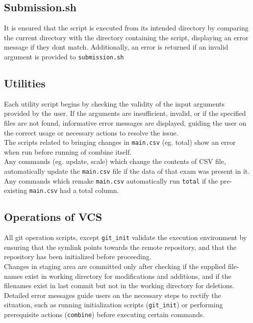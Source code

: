 \documentclass{article}
\begin{document}
\subsection{Submission.sh}
It is ensured that the script is executed from its intended directory by comparing the current directory with the directory containing the script, displaying an error message if they dont match. Additionally, an error is returned if an invalid argument is provided to \texttt{submission.sh}

\subsection{Utilities}
Each utility script begins by checking the validity of the input arguments provided by the user. If the arguments are insufficient, invalid, or if the specified files are not found, informative error messages are displayed, guiding the user on the correct usage or necessary actions to resolve the issue. \\
The scripts related to bringing changes in \texttt{main.csv} (eg. total) show an error when run before running of combine itself.\\
Any commands (eg. update, scale) which change the contents of CSV file, automatically update the \texttt{main.csv} file if the data of that exam was present in it.\\
Any commands which remake \texttt{main.csv} automatically run \texttt{total} if the pre-existing \texttt{main.csv} had a total column.\\ 

\subsection{Operations of VCS}
All git operation scripts, except \texttt{git\_init} validate the execution environment by ensuring that the symlink points towards the remote repository, and that the repository has been initialized before proceeding.\\
Changes in staging area are committed only after checking if the supplied file-names exist in working directory for modifications and additions, and if the filenames exist in last commit but not in the working directory for deletions.\\
Detailed error messages guide users on the necessary steps to rectify the situation, such as running initialization scripts (\texttt{git\_init}) or performing prerequisite actions (\texttt{combine}) before executing certain commands.\\
\end{document}
